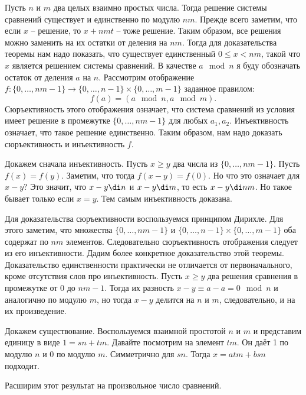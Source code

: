 \thrm Пусть $n$ и $m$ два целых взаимно простых числа. Тогда решение системы сравнений существует и единственно по модулю $nm$.
\ethrm 
{} 
Прежде всего заметим, что если $x$ -- решение, то $x+nmt$ -- тоже решение. Таким образом, все решения можно заменить на их остатки от деления на $nm$. Тогда для доказательства теоремы нам надо показать, что существует единственный $0\leq x< nm$, такой что $x$ является решением системы сравнений.  
В качестве $a\mod n$ я буду обозначать остаток от деления $a$ на $n$.
Рассмотрим отображение $f \colon \{0,\dots, nm-1\} \to \{0,\dots,n-1\}\times \{0,\dots,m-1\}$ заданное правилом:
$$f(a)=(a\mod n, a\mod m).$$
Сюръективность этого отображения означает, что система сравнений из условия имеет решение в промежутке $\{0,\dots,nm-1\}$ для любых $a_1,a_2$. Инъективность означает, что такое решение единственно. Таким образом, нам надо доказать сюръективность и инъективность $f$. 

Докажем сначала инъективность. Пусть $x\geq y$ два числа из  $\{0,\dots,nm-1\}$. Пусть $f(x)=f(y)$. Заметим, что тогда $f(x-y)=f(0)$. Но что это означает для $x-y$? Это значит, что $x-y \di n$ и $x-y\di m$, то есть $x-y\di nm$. Но такое бывает только если $x=y$. Тем самым инъективность доказана.

Для доказательства сюръективности воспользуемся принципом Дирихле. Для этого заметим, что множества $\{0,\dots, nm-1\}$  и  $\{0,\dots,n-1\}\times \{0,\dots,m-1\}$ оба содержат по $nm$ элементов. Следовательно сюръективность отображения следует из его инъективности.
\endproof
{} Дадим более конкретное доказательство этой теоремы.
Доказательство единственности практически не отличается от первоначального, кроме отсутствия слов про инъективность. Пусть $x\geq y$ два решения сравнения в промежутке от $0$ до $nm-1$. Тогда их разность $x-y\equiv a-a =0 \mod n$ и аналогично по модулю $m$, но тогда $x-y$ делится на $n$ и $m$, следовательно, и на их произведение.

Докажем существование. Воспользуемся взаимной простотой $n$ и $m$ и представим единицу в виде $1=sn+tm$. Давайте посмотрим на элемент $tm$. Он даёт 1 по модулю $n$ и 0 по модулю $m$. Симметрично для  $sn$. Тогда $x=atm+bsn$ подходит. 
\endproof

Расширим этот результат на произвольное число сравнений.

